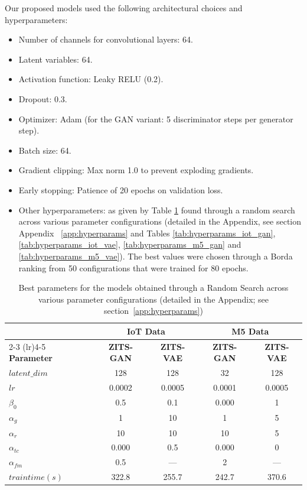 \documentclass[make,article,submit,moreauthors]{Definitions/mdpi}
\begin{document}
Our proposed models used the following architectural choices and hyperparameters:
\begin{itemize}
    \item {Number of channels for convolutional layers:} 64.
    \item {Latent variables:} 64.
    \item {Activation function:} Leaky RELU (0.2).
    \item {Dropout:} 0.3.
    
    \item {Optimizer:} Adam (for the GAN variant: 5 discriminator steps per generator step). 
    \item {Batch size:} 64.
    \item {Gradient clipping:} Max norm 1.0 to prevent exploding gradients.
    \item {Early stopping:} Patience of 20 epochs on validation loss.
    \item {Other hyperparameters:} as given by Table \ref{tab:hyperparam} found through a random search across various parameter configurations (detailed in the Appendix, see section Appendix ~\ref{app:hyperparams} and Tables \ref{tab:hyperparams_iot_gan}, \ref{tab:hyperparams_iot_vae}, \ref{tab:hyperparams_m5_gan} and \ref{tab:hyperparams_m5_vae}). The best values were chosen through a Borda ranking from 50 configurations that were trained for 80 epochs.
\end{itemize}

\begin{table}[htbp]
\centering
\caption{Best parameters for the models obtained through a Random Search across various parameter configurations (detailed in the Appendix; see section~\ref{app:hyperparams})}
\label{tab:hyperparam}
\begin{tabular}{l cccc}
\toprule
& \multicolumn{2}{c}{\textbf{IoT Data}} & \multicolumn{2}{c}{\textbf{M5 Data}} \\
\cmidrule(lr){2-3} \cmidrule(lr){4-5}
\textbf{Parameter} & \textbf{ZITS-GAN} & \textbf{ZITS-VAE} & \textbf{ZITS-GAN} & \textbf{ZITS-VAE} \\
\midrule
$\mathit{latent\_dim}$ & 128     & 128     & 32      & 128     \\
$\mathit{lr}$         & 0.0002  & 0.0005  & 0.0001  & 0.0005  \\
$\beta_0$    & 0.5     & 0.1     & 0.000   & 1       \\
$\alpha_{g}$ & 1       & 10      & 1       & 5       \\
$\alpha_{r}$ & 10      & 10      & 10      & 5       \\
$\alpha_{tc}$    & 0.000   & 0.5     & 0.000   & 0       \\
$\alpha_{fm}$    & 0.5     & ---     & 2       & ---     \\
$\mathit{train time (s)}$   & 322.8   & 255.7   & 242.7   & 370.6   \\
\bottomrule
\end{tabular}
\end{table}
\end{document}
